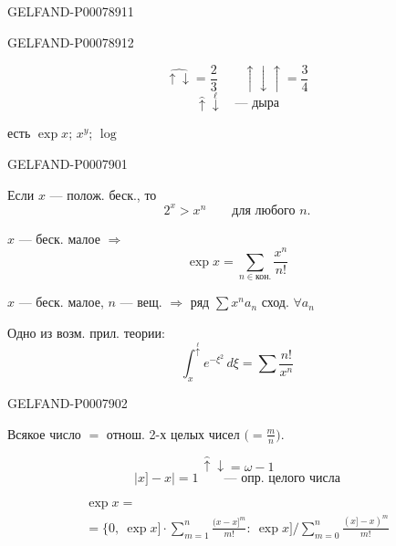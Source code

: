 \begin{GelfandAdjacentEvidence}{GELFAND-P000789}{11}

\end{GelfandAdjacentEvidence}
\begin{GelfandAdjacentEvidence}{GELFAND-P000789}{12}


\[
\widehat{\uparrow\downarrow}=\frac23\qquad\uparrow\downarrow\uparrow=\frac34
\]
\[
\widehat{\uparrow}\overset{\ell}{\downarrow}\quad\text{--- дыра}
\]
\end{GelfandAdjacentEvidence}


есть \(\exp x\); \(x^y\); \(\log\)


\begin{GelfandAdjacentEvidence}{GELFAND-P000790}{1}

Если \(x\) --- полож. беск., то
\[
2^x>x^n\qquad\text{для любого }n.
\]

\(x\) --- беск. малое \(\Rightarrow\)
\[
\exp x=\sum_{n\in\text{кон.}}\frac{x^n}{n!}
\]

\(x\) --- беск. малое, \(n\) --- вещ. \(\Rightarrow\) ряд
\(\sum x^n a_n\) сход. \(\forall a_n\)

Одно из возм. прил. теории:
\[
\int_x^{\overset{\ell}{\uparrow}}e^{-\xi^2}\,d\xi
=\sum\frac{n!}{x^n}
\]
\end{GelfandAdjacentEvidence}
\begin{GelfandAdjacentEvidence}{GELFAND-P000790}{2}


Всякое число \(=\) отнош. 2-х целых чисел \(\bigl(=\frac mn\bigr)\).

\[
\widehat{\uparrow}\downarrow=\omega-1
\]
\[
\lvert x]-x\rvert=1\qquad\text{--- опр. целого числа}
\]

\begin{gather*}
\exp x=\\
=\bigl\{0,\ \exp x]\cdot\sum_{m=1}^{n}\frac{(x-x]^{m}}{m!}
:\ \exp x]\bigg/\sum_{m=0}^{n}\frac{(x]-x)^m}{m!}
\end{gather*}
\end{GelfandAdjacentEvidence}



